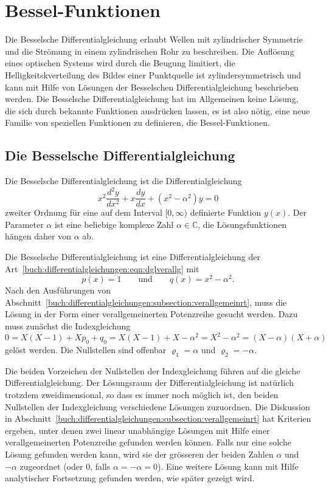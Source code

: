 %
%
%
\section{Bessel-Funktionen
\label{buch:differntialgleichungen:section:bessel}}
Die Besselsche Differentialgleichung
erlaubt Wellen mit zylindrischer
Symmetrie und die Strömung in einem zylindrischen Rohr zu beschreiben.
Die Auflösung eines optischen Systems wird durch die Beugung limitiert,
die Helligkeitskverteilung des Bildes einer Punktquelle ist
zylindersymmetrisch und kann mit Hilfe von Lösungen der Besselschen
Differentialgleichung beschrieben werden.
Die Besselsche Differentialgleichung hat im Allgemeinen keine Lösung,
die sich durch bekannte Funktionen ausdrücken lassen, es ist also
nötig, eine neue Familie von speziellen Funktionen zu definieren,
die Bessel-Funktionen.

\subsection{Die Besselsche Differentialgleichung}
Die Besselsche Differentialgleichung ist die Differentialgleichung
\[
x^2\frac{d^2y}{dx^2} + x\frac{dy}{dx} + (x^2-\alpha^2)y = 0
\]
zweiter Ordnung
für eine auf dem Interval $[0,\infty)$ definierte Funktion $y(x)$.
Der Parameter $\alpha$ ist eine beliebige komplexe Zahl $\alpha\in \mathbb{C}$,
die Lösungsfunktionen hängen daher von $\alpha$ ab.

Die Besselsche Differentialgleichung ist eine Differentialgleichung
der Art~\eqref{buch:differentialgleichungen:eqn:dglverallg} mit
\[
p(x) = 1
\qquad\text{und}\qquad
q(x) = x^2-\alpha^2.
\]
Nach den Ausführungen von
Abschnitt~\ref{buch:differentialgleichungen:subsection:verallgemeinrt},
muss die Lösung in der Form einer verallgemeinerten Potenzreihe 
gesucht werden.
Dazu muss zunächst die Indexgleichung
\[
0
=
X(X-1) + Xp_0 + q_0
=
X(X-1) + X - \alpha^2
=
X^2-\alpha^2
=
(X-\alpha)(X+\alpha)
\]
gelöst werden.
Die Nullstellen sind offenbar $\varrho_1=\alpha$ und $\varrho_2=-\alpha$.

Die beiden Vorzeichen der Nullstellen der Indexgleichung führen
auf die gleiche Differentialgleichung.
Der Lösungsraum der Differentialgleichung ist natürlich trotzdem
zweidimensional, so dass es immer noch möglich ist, den
beiden Nullstellen der Indexgleichung verschiedene Lösungen
zuzuordnen.
Die Diskussion in
Abschnitt~\ref{buch:differentialgleichungen:subsection:verallgemeinrt}
hat Kriterien ergeben, unter denen zwei linear unabhängige Lösungen
mit Hilfe einer verallgemeinerten Potenzreihe gefunden werden können.
Falls nur eine solche Lösung gefunden werden kann, wird sie der grösseren
der beiden Zahlen $\alpha$ und $-\alpha$ zugeordnet
(oder $0$, falls $\alpha=-\alpha=0$).
Eine weitere Lösung kann mit Hilfe analytischer Fortsetzung gefunden werden,
wie später gezeigt wird.

